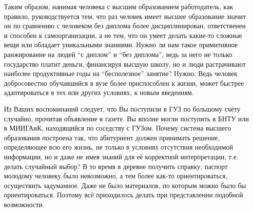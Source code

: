 \begin{drama}
Таким образом, нанимая человека с высшим образованием работодатель, как правило, руководствуется тем, что раз человек имеет высшее образование значит он по сравнению с человеком без диплома более дисциплинирован, ответственен и способен к самоорганизации, а не тем, что он умеет делать какие-то сложные вещи или обладает уникальными знаниями. Нужно ли нам такое примитивное ранжирование на людей “с диплом” и “без диплома”, ведь за него не только государство платит деньги, финансируя высшую школу, но и люди растрачивают наиболее продуктивные годы на “бесполезное” занятие?
	\michaelspeaks Нужно. Ведь человек добросовестно обучавшийся в вузе более приспособлен к жизни, может быстрее адаптироваться в тех или других условиях, к новым введениям.	
	
	\maxspeaks Из Ваших воспоминаний следует, что Вы поступили в ГУЗ по большому счёту случайно, прочитав объявление в газете. Вы вполне могли поступить в БНТУ или в МИИГАиК, находящийся по соседству с ГУЗом. Почему система высшего образования построена так, что абитуриент должен принимать решение, определяющее всю его жизнь, не только в условиях отсутствия необходимой информации, но и даже не имея знаний для её корректной интерпретации, т.е. делать случайный выбор?
	\michaelspeaks В то время в деревне получить справку, паспорт молодому человеку было невозможно, а тем более как-то ориентироваться, осуществить задуманное. Даже не было материалов, по которым можно было бы ориентироваться. Поэтому всё приходилось делать при представлении подобной возможности.


\end{drama}
